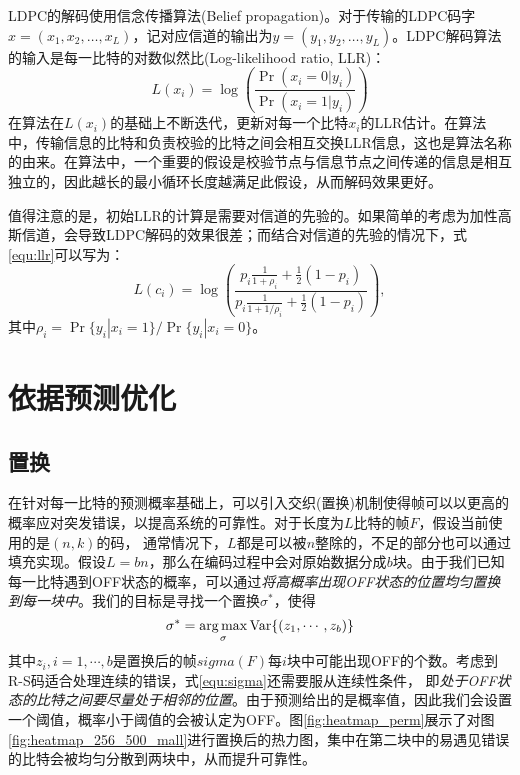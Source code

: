 LDPC的解码使用信念传播算法(Belief propagation)。对于传输的LDPC码字$x = (x_1, x_2, …, x_{L})$，记对应信道的输出为$y = (y_1, y_2, …, y_{L})$。LDPC解码算法的输入是每一比特的对数似然比(Log-likelihood ratio, LLR)：
\begin{equation}
\label{equ:llr}
L(x_i)=\log\left(\frac{\Pr(x_i=0|y_i)}{\Pr(x_i=1|y_i)}\right)
\end{equation}
在算法在$L(x_i)$的基础上不断迭代，更新对每一个比特$x_i$的LLR估计。在算法中，传输信息的比特和负责校验的比特之间会相互交换LLR信息，这也是算法名称的由来。在算法中，一个重要的假设是校验节点与信息节点之间传递的信息是相互独立的，因此越长的最小循环长度越满足此假设，从而解码效果更好。

值得注意的是，初始LLR的计算是需要对信道的先验的。如果简单的考虑为加性高斯信道，会导致LDPC解码的效果很差；而结合对信道的先验的情况下，式\ref{equ:llr}可以写为：
\begin{equation}
\label{equ:llr_new}
L(c_i)=\log\left(\frac{ p_i \frac{1}{1+\rho_i} + \frac{1}{2} (1-p_i) }{ p_i \frac{1}{1+1/\rho_i} + \frac{1}{2} (1-p_i)  }\right),
\end{equation}
其中$\rho_i = \Pr\{y_i|x_i=1\}/\Pr\{y_i|x_i=0\}$。
\section{依据预测优化}

\subsection{置换}
\label{subsec:perm}
在针对每一比特的预测概率基础上，可以引入交织(置换)机制使得帧可以以更高的概率应对突发错误，以提高系统的可靠性。对于长度为$L$比特的帧$F$，假设当前使用的是$(n,k)$的码，
通常情况下，$L$都是可以被$n$整除的，不足的部分也可以通过填充实现。假设$L = bn$，那么在编码过程中会对原始数据分成$b$块。由于我们已知每一比特遇到OFF状态的概率，可以通过\emph{将高概率出现OFF状态的位置均匀置换到每一块中}。我们的目标是寻找一个置换$\sigma^\ast$，使得
\begin{equation}
\label{equ:sigma}
\sigma^\ast = \operatorname*{arg\,max}_\sigma \mathrm{Var} \{ (z_1, \cdots, z_b) \} 
\end{equation}
其中$z_i, i = 1,\cdots,b$是置换后的帧$sigma(F)$每$i$块中可能出现OFF的个数。考虑到R-S码适合处理连续的错误，式\ref{equ:sigma}还需要服从连续性条件，
即\emph{处于OFF状态的比特之间要尽量处于相邻的位置}。由于预测给出的是概率值，因此我们会设置一个阈值，概率小于阈值的会被认定为OFF。图\ref{fig:heatmap_perm}展示了对图\ref{fig:heatmap_256_500_mall}进行置换后的热力图，集中在第二块中的易遇见错误的比特会被均匀分散到两块中，从而提升可靠性。

